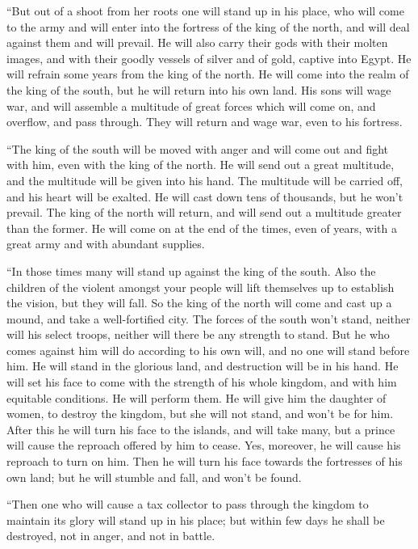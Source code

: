  ``But out of a shoot from her roots one will stand up in
his place, who will come to the army and will enter into the fortress of
the king of the north, and will deal against them and will prevail.
 He will also carry their gods with their molten images, and
with their goodly vessels of silver and of gold, captive into Egypt. He
will refrain some years from the king of the north.  He will
come into the realm of the king of the south, but he will return into
his own land.  His sons will wage war, and will assemble a
multitude of great forces which will come on, and overflow, and pass
through. They will return and wage war, even to his fortress.

 ``The king of the south will be moved with anger and will
come out and fight with him, even with the king of the north. He will
send out a great multitude, and the multitude will be given into his
hand.  The multitude will be carried off, and his heart
will be exalted. He will cast down tens of thousands, but he won't
prevail.  The king of the north will return, and will send
out a multitude greater than the former. He will come on at the end of
the times, even of years, with a great army and with abundant supplies.

 ``In those times many will stand up against the king of
the south. Also the children of the violent amongst your people will
lift themselves up to establish the vision, but they will fall.
 So the king of the north will come and cast up a mound,
and take a well-fortified city. The forces of the south won't stand,
neither will his select troops, neither will there be any strength to
stand.  But he who comes against him will do according to
his own will, and no one will stand before him. He will stand in the
glorious land, and destruction will be in his hand.  He
will set his face to come with the strength of his whole kingdom, and
with him equitable conditions. He will perform them. He will give him
the daughter of women, to destroy the kingdom, but she will not stand,
and won't be for him.  After this he will turn his face to
the islands, and will take many, but a prince will cause the reproach
offered by him to cease. Yes, moreover, he will cause his reproach to
turn on him.  Then he will turn his face towards the
fortresses of his own land; but he will stumble and fall, and won't be
found.

 ``Then one who will cause a tax collector to pass through
the kingdom to maintain its glory will stand up in his place; but within
few days he shall be destroyed, not in anger, and not in battle.

